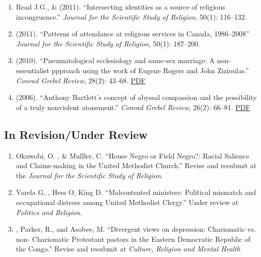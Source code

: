\begin{enumerate}
\item Read J.G., \& \Eagle \hspace{.01em} (2011). ``Intersecting identities as a source of religious incongruence.''  \emph{Journal for the Scientific Study of Religion}, 50(1): 116--132. 

\item \Eagle \hspace{.01em} (2011). ``Patterns of attendance at religious services in Canada, 1986--2008'' \emph{Journal for the Scientific Study of Religion}, 50(1): 187--200. 

\item \Eagle \hspace{.01em} (2010). ``Pneumatological ecclesiology and same-sex marriage: A non-essentialist ppproach using the work of Eugene Rogers and John Zizioulas.'' \emph{Conrad Grebel Review}, 28(2): 43--68. \href{https://www.davideagle.org/publication/eagle-pneumatological-ecclesiology-samesex-2010/eagle-pneumatological-ecclesiology-samesex-2010.pdf}{PDF}

\item \Eagle\hspace{.01em} (2006). ``Anthony Bartlett's concept of abyssal compassion and the possibility of a truly nonviolent atonement.'' \emph{Conrad Grebel Review}, 26(2): 66--81. \href{https://www.davideagle.org/publication/eagle-anthony-bartlett-concept-2006/eagle-anthony-bartlett-concept-2006.pdf}{PDF}

\end{enumerate}

\subsection*{In Revision/Under Review}
\begin{enumerate}
\item Okuwobi, O. \Eagle, \& Mulller, C. ``House Negro or Field Negro?: Racial Salience and Claims-making in the United Methodist Church.'' Revise and resubmit at the \textit{Journal for the Scientific Study of Religion}.

\item Varela G, \Eagle, Hess O, King D. ``Malcontented ministers: Political mismatch and occupational distress among United Methodist Clergy.'' Under review at \textit{Politics and Religion.}

\item \Eagle, Parker, R., and Asobee, M. ``Divergent views on depression: Charismatic vs. non- Charismatic Protestant pastors in the Eastern Democratic Republic of the Congo.'' Revise and resubmit at \textit{Culture, Religion and Mental Health}




\end{enumerate}

